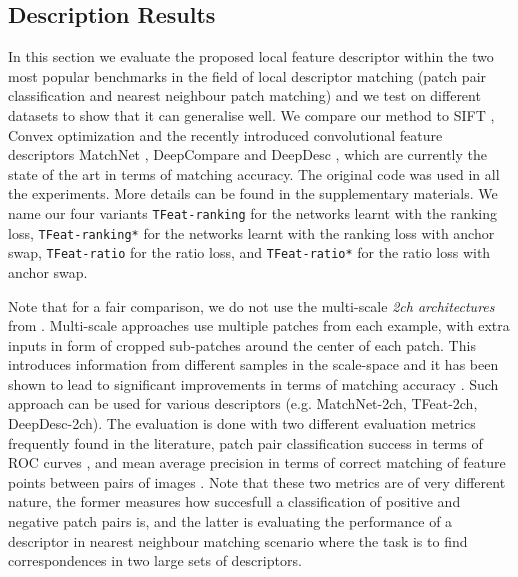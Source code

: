 \subsection{Description Results}

In this section we evaluate the proposed local feature descriptor
within the two most popular benchmarks in the field of local
descriptor matching (patch pair classification and nearest neighbour patch matching) and we test on different datasets to show
that it can generalise well. We compare our method to SIFT
\cite{Lowe:2004:DIF:993451.996342}, Convex optimization
\cite{simonyan2014learning} and the recently introduced convolutional feature descriptors MatchNet \cite{Han_2015_CVPR}, DeepCompare \cite{ZagoruykoCVPR2015} and DeepDesc \cite{simo2015deepdesc}, which are currently the state of the art in terms of matching accuracy.  The
original code  was used in all the experiments. More details can be found in the supplementary
materials. We name our four variants \texttt{TFeat-ranking} for the
networks learnt with the ranking loss, \texttt{TFeat-ranking*} for
the networks learnt with the ranking loss with anchor swap,
\texttt{TFeat-ratio} for the ratio loss, and \texttt{TFeat-ratio*} for the
ratio loss with anchor swap.

\newpage
Note that for a fair comparison, we do not use the multi-scale {\em
  2ch architectures} from \cite{ZagoruykoCVPR2015}. Multi-scale
approaches use multiple patches from each example, with extra inputs
in form of cropped sub-patches around the center of each patch. This
introduces information from different samples in the scale-space and
it has been shown to lead to significant improvements in terms of
matching accuracy \cite{DBLP:journals/corr/DongS14}. Such approach can
be used for various descriptors (e.g. MatchNet-2ch, TFeat-2ch,
DeepDesc-2ch). The evaluation is done with two different evaluation
metrics frequently found in the literature, patch pair classification
success in terms of ROC curves \cite{WHB09}, and mean average
precision in terms of correct matching of feature points between pairs
of images \cite{schmid2003performance}. Note that these two metrics
are of very different nature, the former measures how succesfull a
classification of positive and negative patch pairs is, and the latter
is evaluating the performance of a descriptor in nearest neighbour
matching scenario where the task is to find correspondences in two
large sets of descriptors.

